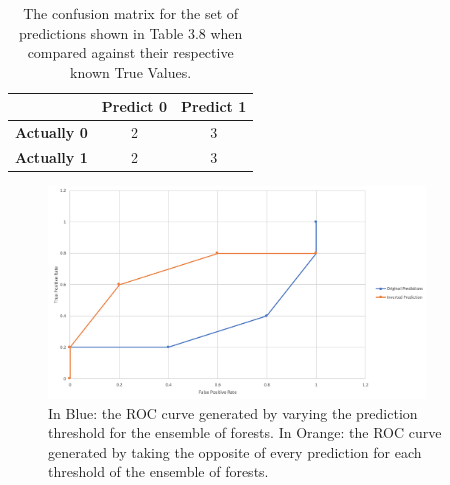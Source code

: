 \begin{table}
\centering
\begin{tabular}{| c | c | c |}
\hline
 & \textbf{Predict 0} & \textbf{Predict 1}  \\ 
\hline
\textbf{Actually 0} & 2 & 3 \\ 
\hline
\textbf{Actually 1} & 2 & 3 \\
\hline
\end{tabular}
\caption[Our Example's Confusion Matrix]{The confusion matrix for the set of predictions shown in Table 3.8 when compared against their respective known True Values.}
\end{table}

\begin{figure}[h]
\centering
\includegraphics[width=10cm]{body/methodology/Both_ROC.png}
\caption[Combined ROC Curve for a Sample Classification]{In Blue: the ROC curve generated by varying the prediction threshold for the ensemble of forests. In Orange: the ROC curve generated by taking the opposite of every prediction for each threshold of the ensemble of forests.}
\end{figure}

